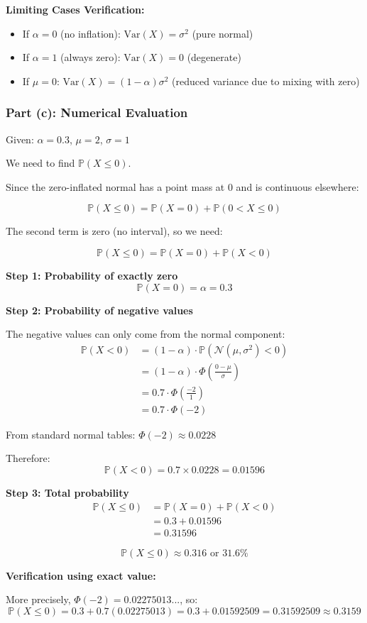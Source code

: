 \documentclass[12pt]{article}
\begin{document}
\begin{explanation}
\textbf{Limiting Cases Verification:}
\begin{itemize}
    \item If \(\alpha = 0\) (no inflation): \(\text{Var}(X) = \sigma^2\)  (pure normal)
    \item If \(\alpha = 1\) (always zero): \(\text{Var}(X) = 0\)  (degenerate)
    \item If \(\mu = 0\): \(\text{Var}(X) = (1-\alpha)\sigma^2\) (reduced variance due to mixing with zero)
\end{itemize}
\end{explanation}

\subsubsection{Part (c): Numerical Evaluation}

\begin{solution}
Given: \(\alpha = 0.3\), \(\mu = 2\), \(\sigma = 1\)

We need to find \(\mathbb{P}(X \leq 0)\).

Since the zero-inflated normal has a point mass at 0 and is continuous elsewhere:

\[
\mathbb{P}(X \leq 0) = \mathbb{P}(X = 0) + \mathbb{P}(0 < X \leq 0)
\]

The second term is zero (no interval), so we need:

\[
\mathbb{P}(X \leq 0) = \mathbb{P}(X = 0) + \mathbb{P}(X < 0)
\]

\textbf{Step 1: Probability of exactly zero}
\[
\mathbb{P}(X = 0) = \alpha = 0.3
\]

\textbf{Step 2: Probability of negative values}

The negative values can only come from the normal component:
\begin{align}
\mathbb{P}(X < 0) &= (1-\alpha) \cdot \mathbb{P}(\mathcal{N}(\mu, \sigma^2) < 0) \\
&= (1-\alpha) \cdot \Phi\left(\frac{0-\mu}{\sigma}\right) \\
&= 0.7 \cdot \Phi\left(\frac{-2}{1}\right) \\
&= 0.7 \cdot \Phi(-2)
\end{align}

From standard normal tables: \(\Phi(-2) \approx 0.0228\)

Therefore:
\[
\mathbb{P}(X < 0) = 0.7 \times 0.0228 = 0.01596
\]

\textbf{Step 3: Total probability}
\begin{align}
\mathbb{P}(X \leq 0) &= \mathbb{P}(X = 0) + \mathbb{P}(X < 0) \\
&= 0.3 + 0.01596 \\
&= 0.31596
\end{align}

\[
\boxed{\mathbb{P}(X \leq 0) \approx 0.316 \text{ or } 31.6\%}
\]

\textbf{Verification using exact value:}

More precisely, \(\Phi(-2) = 0.02275013...\), so:
\[
\mathbb{P}(X \leq 0) = 0.3 + 0.7(0.02275013) = 0.3 + 0.01592509 = 0.31592509 \approx \boxed{0.3159}
\]
\end{solution}
\end{document}
